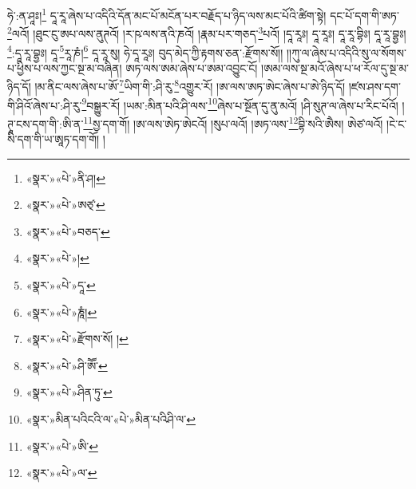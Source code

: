 ཧེ་:ན་ཤཱཿ།\footnote{«སྣར་»«པེ་»ནི་ཤ།} དཱ་རཱ་ཞེས་པ་འདིའི་དོན་མང་པོ་མངོན་པར་བརྗོད་པ་ཉིད་ལས་མང་པོའི་ཚིག་སྟེ། དང་པོ་དག་གི་ཨཏ་\footnote{«སྣར་»«པེ་»ཨཙ྄་}ལའོ། །ཐུང་ངུ་ཨཔ་ལས་ནུཊའོ། །ར་ཥ་ལས་ནའི་ཎའོ། །རྣམ་པར་གཅད་\footnote{«སྣར་»«པེ་»བཅད་}པའོ། །དཱ་རཱཿ། དཱ་རཱཿ། དཱ་རཱ་བྷིཿ། དཱ་རཱ་བྷྱཿ། \footnote{«སྣར་»«པེ་»།  }:དཱ་རཱ་བྷྱཿ། དཱ་\footnote{«སྣར་»«པེ་»དཱ་}རཱ་ཎཾ།\footnote{«སྣར་»«པེ་»ཎཱཾ།} དཱ་རཱ་སུ། ཧེ་དཱ་རཱཿ། བུད་མེད་ཀྱི་རྟགས་ཅན་:རྫོགས་སོ།། །།ཀུ་ལ་ཞེས་པ་འདིའི་སུ་ལ་སོགས་པ་ཕྱིས་པ་ལས་ཀྱང་སྔ་མ་བཞིན། ཨཏ་ལས་ཨམ་ཞེས་པ་ཨམ་འབྱུང་ངོ། །ཨམ་ལས་སྔ་མའོ་ཞེས་པ་ཕ་རོལ་དུ་སྔ་མ་ཉིད་དོ། །མ་ནིང་ལས་ཞེས་པ་ཨོ་\footnote{«སྣར་»«པེ་»རྫོགས་སོ། །}ཡིག་གི་:ཤི་རུ་\footnote{«སྣར་»«པེ་»ཤི་ཨཽ་}འགྱུར་རོ། །ཨ་ལས་ཨཏ་ཨེང་ཞེས་པ་ཨེ་ཉིད་དོ། །ཛས་ཤས་དག་གི་ཤིའོ་ཞེས་པ་:ཤི་རུ་\footnote{«སྣར་»«པེ་»ཤིན་ཏུ་}བསྒྱུར་རོ། །ཡམ་:མིན་པའི་ཤི་ལས་\footnote{«སྣར་»མིན་པའིངའི་ལ་«པེ་»མིན་པའིཤི་ལ་}ཞེས་པ་སྔོན་དུ་ནུ་མའོ། །ཤི་སུཊ་ལ་ཞེས་པ་རིང་པོའོ། །ཊཱ་ངས་དག་གི་:ཨི་ན་\footnote{«སྣར་»«པེ་»ཨི་}སྱ་དག་གོ། །ཨ་ལས་ཨེཏ་ཨེངའོ། །སུཔ་ལའོ། །ཨཏ་ལས་\footnote{«སྣར་»«པེ་»ལ་}བྷི་སའི་ཨཻས། ཨེཙ་ལའོ། །ངེ་ང་སི་དག་གི་ཡ་ཨཱཏ་དག་གོ། །
